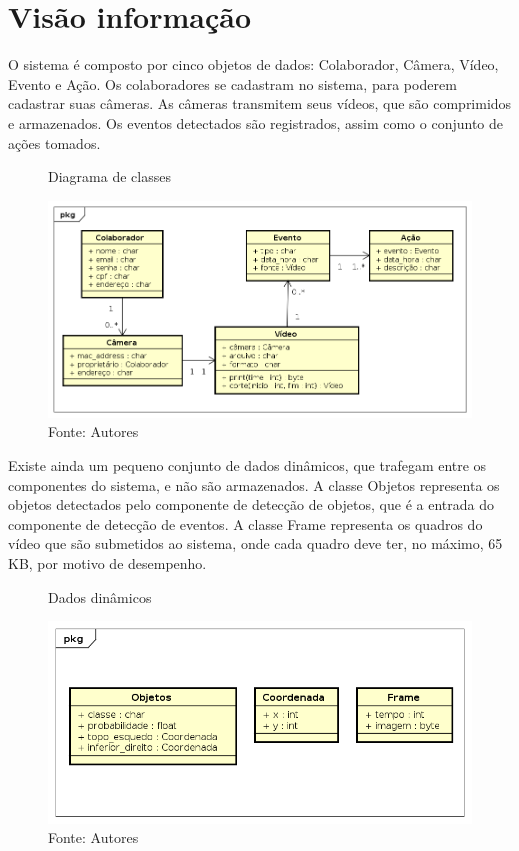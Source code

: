 \documentclass[]{politex}
\begin{document}
\section{Visão informação}
O sistema é composto por cinco objetos de dados: Colaborador, Câmera, Vídeo, Evento e Ação. Os colaboradores se cadastram no sistema, para poderem cadastrar suas câmeras. As câmeras transmitem seus vídeos, que são comprimidos e armazenados. Os eventos detectados são registrados, assim como o conjunto de ações tomados.

\begin{figure}[H]
    \centering
    \caption{Diagrama de classes}
    \includegraphics[width=\textwidth]{Visao_informacao_total}
    \caption*{Fonte: Autores}
    \label{fig:classeVisao}
\end{figure}

Existe ainda um pequeno conjunto de dados dinâmicos, que trafegam entre os componentes do sistema, e não são armazenados. A classe Objetos representa os objetos detectados pelo componente de detecção de objetos, que é a entrada do componente de detecção de eventos. A classe Frame representa os quadros do vídeo que são submetidos ao sistema, onde cada quadro deve ter, no máximo, 65 KB, por motivo de desempenho.

\begin{figure}[H]
    \centering
    \caption{Dados dinâmicos}
    \includegraphics[width=\textwidth]{Visao_info_dinamico}
    \caption*{Fonte: Autores}
    \label{fig:visaoInfomacao_dinamico}
\end{figure}
\end{document}
